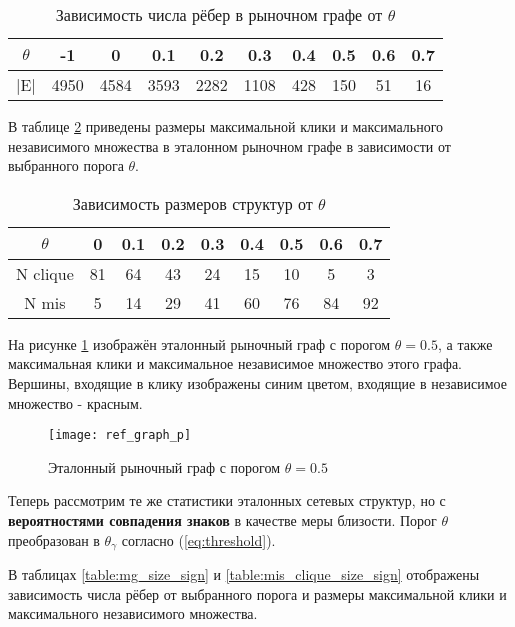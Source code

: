 \begin{table}[h!]
\centering
\begin{tabular}{ |c|c|c|c|c|c|c|c|c|c| } 
 \hline
 $\theta$ & -1 & 0 & 0.1 & 0.2 & 0.3 & 0.4 & 0.5 & 0.6 & 0.7 \\ 
 \hline
 |E|	  & 4950 & 4584 & 3593 & 2282 & 1108 & 428 & 150 & 51 & 16\\ 
 \hline
\end{tabular}
\caption{Зависимость числа рёбер в рыночном графе от $\theta$}
\label{table:mg_size}
\end{table}


В таблице \ref{table:mis_clique_size} приведены размеры максимальной клики и максимального независимого множества в эталонном рыночном графе в зависимости от выбранного порога $\theta$.

\begin{table}[h!]
\centering
\begin{tabular}{ |c|c|c|c|c|c|c|c|c| } 
 \hline
 $\theta$ & 0 & 0.1 & 0.2 & 0.3 & 0.4 & 0.5 & 0.6 & 0.7 \\ 
 \hline
 N clique & 81 & 64 & 43 & 24 & 15 & 10 & 5 & 3\\ 
 \hline
 N mis    & 5  & 14 & 29 & 41 & 60 & 76 & 84 & 92\\ 
 \hline
\end{tabular}
\caption{Зависимость размеров структур от $\theta$}
\label{table:mis_clique_size}
\end{table}

На рисунке \ref{fig:ref_graph_p} изображён эталонный рыночный граф с порогом $\theta=0.5$, а также максимальная клики и максимальное независимое множество этого графа. Вершины, входящие в клику изображены синим цветом, входящие в независимое множество - красным.

\begin{figure}[H]
\centering
\texttt{[image: ref\_graph\_p]}
\caption{Эталонный рыночный граф с порогом $\theta=0.5$}
\label{fig:ref_graph_p}
\end{figure}



Теперь рассмотрим те же статистики эталонных сетевых структур, но с\textbf{ вероятностями совпадения знаков} в качестве меры близости. Порог $\theta$ преобразован в $\theta_\gamma$ согласно (\ref{eq:threshold}). 

В таблицах \ref{table:mg_size_sign} и \ref{table:mis_clique_size_sign} отображены зависимость числа рёбер от выбранного порога и  размеры максимальной клики и максимального независимого множества.


